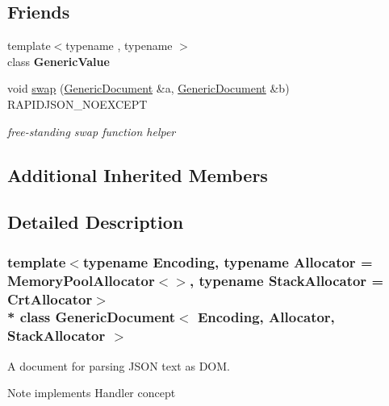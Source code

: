 \subsection*{Friends}
\begin{DoxyCompactItemize}
\item 
{\footnotesize template$<$typename , typename $>$ }\\class {\bfseries Generic\+Value}\hypertarget{classGenericDocument_a899449e1a645b5e377af059fb61113d8}{}\label{classGenericDocument_a899449e1a645b5e377af059fb61113d8}

\item 
void \hyperlink{classGenericDocument_a0d63efcc43758ac3aed77e868233369d}{swap} (\hyperlink{classGenericDocument}{Generic\+Document} \&a, \hyperlink{classGenericDocument}{Generic\+Document} \&b) R\+A\+P\+I\+D\+J\+S\+O\+N\+\_\+\+N\+O\+E\+X\+C\+E\+PT
\begin{DoxyCompactList}\small\item\em free-\/standing swap function helper \end{DoxyCompactList}\end{DoxyCompactItemize}
\subsection*{Additional Inherited Members}


\subsection{Detailed Description}
\subsubsection*{template$<$typename Encoding, typename Allocator = Memory\+Pool\+Allocator$<$$>$, typename Stack\+Allocator = Crt\+Allocator$>$\\*
class Generic\+Document$<$ Encoding, Allocator, Stack\+Allocator $>$}

A document for parsing J\+S\+ON text as D\+OM. 

\begin{DoxyNote}{Note}
implements Handler concept 
\end{DoxyNote}

